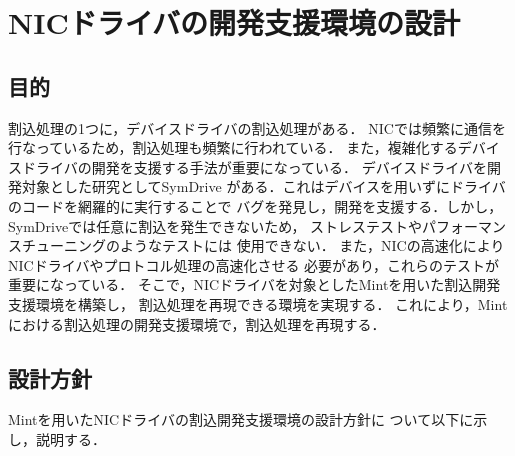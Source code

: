 \documentclass[submit,techreq,noauthor,dvipdfmx]{ipsj}
\begin{document}
\section{NICドライバの開発支援環境の設計}\label{chap:design_of_debugging_invironment_of_NIC}

\subsection{目的}\label{sec:purpose}

割込処理の1つに，デバイスドライバの割込処理がある．
NICでは頻繁に通信を行なっているため，割込処理も頻繁に行われている．
また，複雑化するデバイスドライバの開発を支援する手法が重要になっている．
デバイスドライバを開発対象とした研究としてSymDrive\cite{renzelmann2012symdrive}
がある．これはデバイスを用いずにドライバのコードを網羅的に実行することで
バグを発見し，開発を支援する．しかし，SymDriveでは任意に割込を発生できないため，
ストレステストやパフォーマンスチューニングのようなテストには
使用できない．
また，NICの高速化によりNICドライバやプロトコル処理の高速化させる
必要があり\cite{yildirim2012end}，これらのテストが重要になっている．
そこで，NICドライバを対象としたMintを用いた割込開発支援環境を構築し，
割込処理を再現できる環境を実現する．
これにより，Mintにおける割込処理の開発支援環境で，割込処理を再現する．

\subsection{設計方針}\label{sec:policy_of_design}

Mintを用いたNICドライバの割込開発支援環境の設計方針に
ついて以下に示し，説明する．
\end{document}
